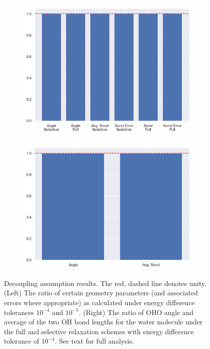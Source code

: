         
        \begin{figure}
             \centering
             \begin{subfigure}[t]{0.45\textwidth}
                 \centering
                 \includegraphics[width=\textwidth]{Figures/System/ediff_geom_ratios.png}
                 
                 \label{fig:ediff_geom_ratios}
             \end{subfigure}
             \hfill
             \begin{subfigure}[t]{0.45\textwidth}
                 \centering
                 \includegraphics[width=\textwidth]{Figures/System/selective_v_full_geom_params.png}
                 \label{fig:selective_v_full}
             \end{subfigure}
                \caption{Decoupling assumption results. The red, dashed line denotes unity. (Left) The ratio of certain geometry parameters (and associated errors where appropriate) as calculated under energy difference tolerances $10^{-4}$ and $10^{-5}$. (Right) The ratio of OHO angle and average of the two OH bond lengths for the water molecule under the full and selective relaxation schemes with energy difference tolerance of $10^{-4}$. See text for full analysis.}
                \label{fig:decouple_assumption}
        \end{figure}
        
